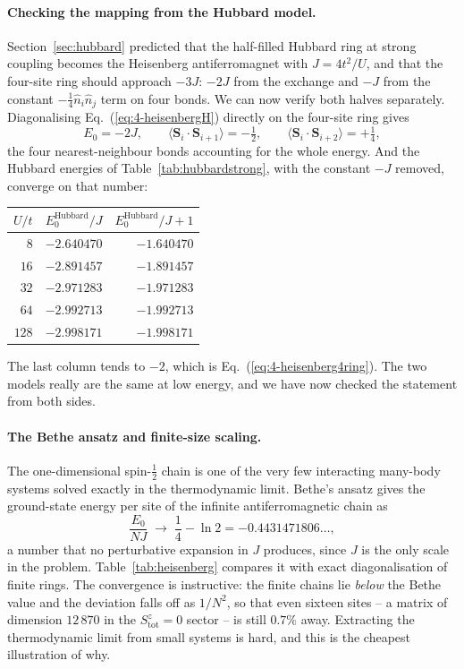\paragraph{Checking the mapping from the Hubbard model.}
Section~\ref{sec:hubbard} predicted that the half-filled Hubbard ring at
strong coupling becomes the Heisenberg antiferromagnet with $J=4t^2/U$, and
that the four-site ring should approach $-3J$: $-2J$ from the exchange and
$-J$ from the constant $-\tfrac14\hat{n}_i\hat{n}_j$ term on four bonds.  We
can now verify both halves separately.  Diagonalising
Eq.~(\ref{eq:4-heisenbergH}) directly on the four-site ring gives
\begin{equation}
  E_0 = -2J,
  \qquad
  \langle\bm{S}_i\cdot\bm{S}_{i+1}\rangle = -\tfrac12,
  \qquad
  \langle\bm{S}_i\cdot\bm{S}_{i+2}\rangle = +\tfrac14,
  \label{eq:4-heisenberg4ring}
\end{equation}
the four nearest-neighbour bonds accounting for the whole energy.  And the
Hubbard energies of Table~\ref{tab:hubbardstrong}, with the constant $-J$
removed, converge on that number:
\begin{center}
\renewcommand{\arraystretch}{1.2}
\setlength{\tabcolsep}{12pt}
\begin{tabular}{rrr}
\toprule
$U/t$ & $E_0^{\mathrm{Hubbard}}/J$ & $E_0^{\mathrm{Hubbard}}/J+1$\\
\midrule
$8$   & $-2.640470$ & $-1.640470$\\
$16$  & $-2.891457$ & $-1.891457$\\
$32$  & $-2.971283$ & $-1.971283$\\
$64$  & $-2.992713$ & $-1.992713$\\
$128$ & $-2.998171$ & $-1.998171$\\
\bottomrule
\end{tabular}
\end{center}
The last column tends to $-2$, which is Eq.~(\ref{eq:4-heisenberg4ring}).  The
two models really are the same at low energy, and we have now checked the
statement from both sides.

\paragraph{The Bethe ansatz and finite-size scaling.}
The one-dimensional spin-$\tfrac12$ chain is one of the very few interacting
many-body systems solved exactly in the thermodynamic limit.  Bethe's ansatz
gives the ground-state energy per site of the infinite antiferromagnetic
chain as
\begin{equation}
  \frac{E_0}{NJ} \;\longrightarrow\; \frac14 - \ln 2 = -0.4431471806\ldots,
  \label{eq:4-bethe}
\end{equation}
a number that no perturbative expansion in $J$ produces, since $J$ is the only
scale in the problem.  Table~\ref{tab:heisenberg} compares it with exact
diagonalisation of finite rings.  The convergence is instructive: the finite
chains lie \emph{below} the Bethe value and the deviation falls off as
$1/N^2$, so that even sixteen sites -- a matrix of dimension $12\,870$ in the
$S^z_{\mathrm{tot}}=0$ sector -- is still $0.7\%$ away.  Extracting the
thermodynamic limit from small systems is hard, and this is the cheapest
illustration of why.

